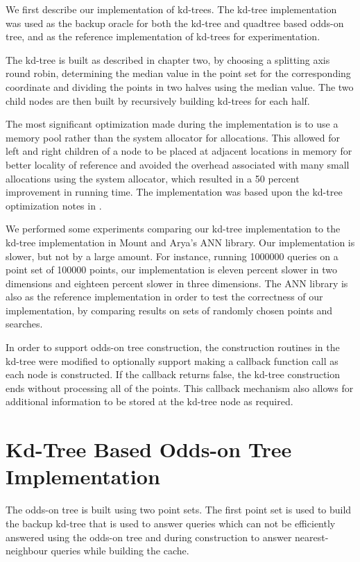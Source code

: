 \documentclass[mcs]{scsthesis}
\begin{document}
We first describe our implementation of kd-trees. The kd-tree implementation was
used as the backup oracle for both the kd-tree and quadtree based odds-on tree,
and as the reference implementation of kd-trees for experimentation.

The kd-tree is built as described in chapter two, by choosing a splitting axis
round robin, determining the median value in the point set for the corresponding
coordinate and dividing the points in two halves using the median value. The two
child nodes are then built by recursively building kd-trees for each half.

The most significant optimization made during the implementation is to use
a memory pool rather than the system allocator for allocations. This allowed
for left and right children of a node to be placed at adjacent locations in
memory for better locality of reference and avoided the overhead associated
with many small allocations using the system allocator, which resulted in a
50 percent improvement in running time. The implementation was based upon the
kd-tree optimization notes in \cite{physicallybasedrendering}.

We performed some experiments comparing our kd-tree implementation to the 
kd-tree implementation in Mount and Arya's ANN library\cite{ann}. Our
implementation is slower, but not by a large amount. For instance, running
1000000 queries on a point set of 100000 points, our implementation is eleven
percent slower in two dimensions and eighteen percent slower in three
dimensions. The ANN library is also as the reference implementation in order
to test the correctness of our implementation, by comparing results on sets
of randomly chosen points and searches.

In order to support odds-on tree construction, the construction routines in
the kd-tree were modified to optionally support making a callback function
call as each node is constructed. If the callback returns false, the kd-tree
construction ends without processing all of the points. This callback
mechanism also allows for additional information to be stored at the kd-tree
node as required. 

\section{Kd-Tree Based Odds-on Tree Implementation}

The odds-on tree is built using two point sets. The first point set is used
to build the backup kd-tree that is used to answer queries which can not be
efficiently answered using the odds-on tree and during construction to
answer nearest-neighbour queries while building the cache.
\end{document}
